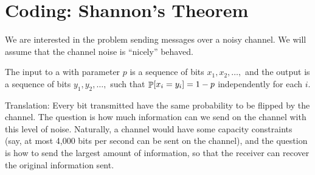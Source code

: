 
%


\newcommand{\StringsX}[1]{\mathcal{S}\pth{#1}}
\newcommand{\NotInS}[2]{\overline{S_{{#1},{#2}}}}
\newcommand{\sring}[1]{\mathrm{ring}\pth[]{#1}}
\newcommand{\bring}[1]{\mathrm{ring}\pth{#1}}


\ChapterPrefix{} \ChapterGen{}





\section{Coding: Shannon's Theorem}

We are interested in the problem sending messages over a noisy
channel. We will assume that the channel noise is ``nicely'' behaved.

\begin{defn}
    The input to a  with parameter $p$
    is a sequence of bits $x_1, x_2, \ldots,$ and the output is a
    sequence of bits $y_1,y_2, \ldots,$ such that
    $\Prob{x_i = y_i} = 1-p$ independently for each $i$.
\end{defn}

Translation: Every bit transmitted have the same probability to be
flipped by the channel. The question is how much information can we
send on the channel with this level of noise. Naturally, a channel
would have some capacity constraints (say, at most 4,000 bits per
second can be sent on the channel), and the question is how to send
the largest amount of information, so that the receiver can recover
the original information sent.

